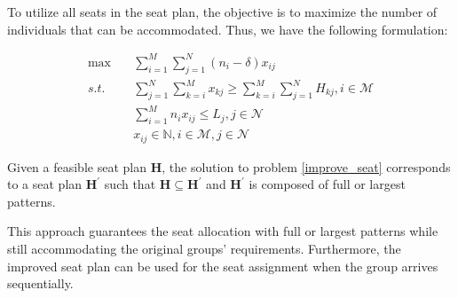 To utilize all seats in the seat plan, the objective is to maximize the number of individuals that can be accommodated. Thus, we have the following formulation:

\begin{equation}\label{improve_seat}
  \begin{aligned}
  \max \quad & \sum_{i=1}^{M} \sum_{j=1}^{N} (n_i-\delta)  x_{ij} \\
  s.t. \quad & \sum_{j=1}^{N} \sum_{k=i}^{M} x_{kj} \geq  \sum_{k=i}^{M} \sum_{j=1}^{N} H_{kj}, i \in \mathcal{M} \\
  & \sum_{i=1}^{M} n_{i} x_{ij} \leq L_{j}, j \in \mathcal{N} \\
  & x_{ij} \in \mathbb{N}, i \in \mathcal{M}, j \in \mathcal{N}
  \end{aligned}
\end{equation}

\begin{prop}\label{prop_construction}
Given a feasible seat plan $\bm{H}$, the solution to problem \eqref{improve_seat} corresponds to a seat plan $\bm{H}^{\prime}$ such that $\bm{H} \subseteq \bm{H}^{\prime}$ and $\bm{H}^{\prime}$ is composed of full or largest patterns.
\end{prop}


This approach guarantees the seat allocation with full or largest patterns while still accommodating the original groups' requirements. Furthermore, the improved seat plan can be used for the seat assignment when the group arrives sequentially.

